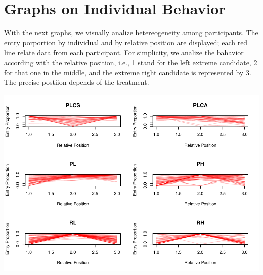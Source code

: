 \documentclass[]{article}
\newenvironment{Shaded}{\begin{snugshade}}{\end{snugshade}}
\newcommand{\KeywordTok}[1]{\textcolor[rgb]{0.13,0.29,0.53}{\textbf{#1}}}
\newcommand{\DataTypeTok}[1]{\textcolor[rgb]{0.13,0.29,0.53}{#1}}
\newcommand{\DecValTok}[1]{\textcolor[rgb]{0.00,0.00,0.81}{#1}}
\newcommand{\StringTok}[1]{\textcolor[rgb]{0.31,0.60,0.02}{#1}}
\newcommand{\OperatorTok}[1]{\textcolor[rgb]{0.81,0.36,0.00}{\textbf{#1}}}
\newcommand{\NormalTok}[1]{#1}
\begin{document}
\begin{Shaded}
\end{Shaded}

\section{Graphs on Individual
Behavior}\label{graphs-on-individual-behavior}

With the next graphs, we visually analize hetereogeneity among
participants. The entry porportion by individual and by relative
position are displayed; each red line relate data from each participant.
For simplicity, we analize the bahavior according with the relative
position, i.e., 1 stand for the left extreme candidate, 2 for that one
in the middle, and the extreme right candidate is represented by 3. The
precise postiion depends of the treatment.

\includegraphics{individual_analysis_report_files/figure-latex/unnamed-chunk-3-1.pdf}
\end{document}

